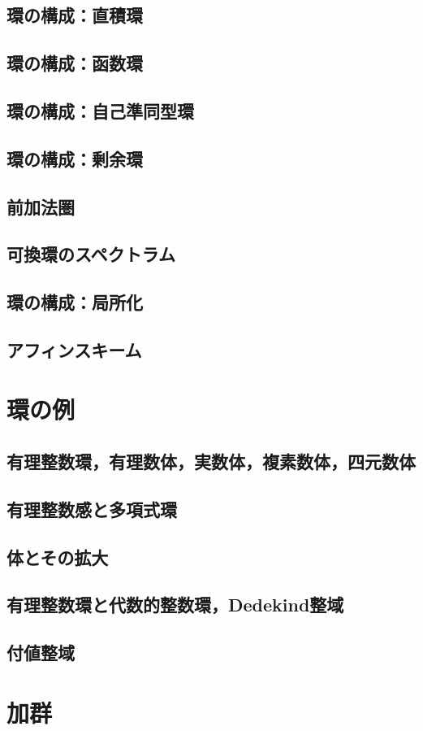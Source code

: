\subsection{環の構成：直積環}
\subsection{環の構成：函数環}
\subsection{環の構成：自己準同型環}
\subsection{環の構成：剰余環}
\subsection{前加法圏}
\subsection{可換環のスペクトラム}
\subsection{環の構成：局所化}
\subsection{アフィンスキーム}
\section{環の例}
\subsection{有理整数環，有理数体，実数体，複素数体，四元数体}
\subsection{有理整数感と多項式環}
\subsection{体とその拡大}
\subsection{有理整数環と代数的整数環，Dedekind整域}
\subsection{付値整域}
\section{加群}



